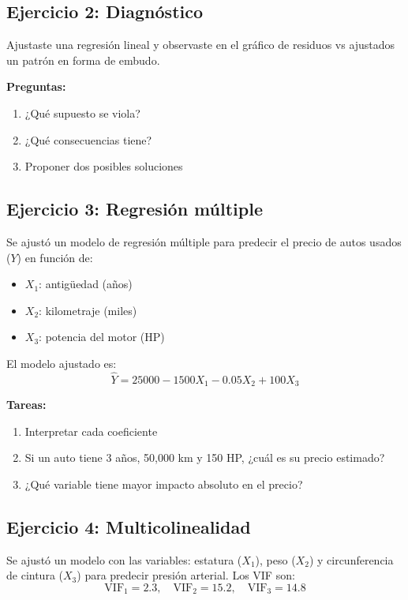 \documentclass[11pt,a4paper]{article}
\begin{document}
\subsection{Ejercicio 2: Diagnóstico}

Ajustaste una regresión lineal y observaste en el gráfico de residuos vs ajustados un patrón en forma de embudo.

\textbf{Preguntas:}
\begin{enumerate}
    \item ¿Qué supuesto se viola?
    \item ¿Qué consecuencias tiene?
    \item Proponer dos posibles soluciones
\end{enumerate}

\subsection{Ejercicio 3: Regresión múltiple}

Se ajustó un modelo de regresión múltiple para predecir el precio de autos usados ($Y$) en función de:
\begin{itemize}
    \item $X_1$: antigüedad (años)
    \item $X_2$: kilometraje (miles)
    \item $X_3$: potencia del motor (HP)
\end{itemize}

El modelo ajustado es:
\[
\hat{Y} = 25000 - 1500 X_1 - 0.05 X_2 + 100 X_3
\]

\textbf{Tareas:}
\begin{enumerate}
    \item Interpretar cada coeficiente
    \item Si un auto tiene 3 años, 50,000 km y 150 HP, ¿cuál es su precio estimado?
    \item ¿Qué variable tiene mayor impacto absoluto en el precio?
\end{enumerate}

\subsection{Ejercicio 4: Multicolinealidad}

Se ajustó un modelo con las variables: estatura ($X_1$), peso ($X_2$) y circunferencia de cintura ($X_3$) para predecir presión arterial. Los VIF son:
\[
\text{VIF}_1 = 2.3, \quad \text{VIF}_2 = 15.2, \quad \text{VIF}_3 = 14.8
\]
\end{document}
